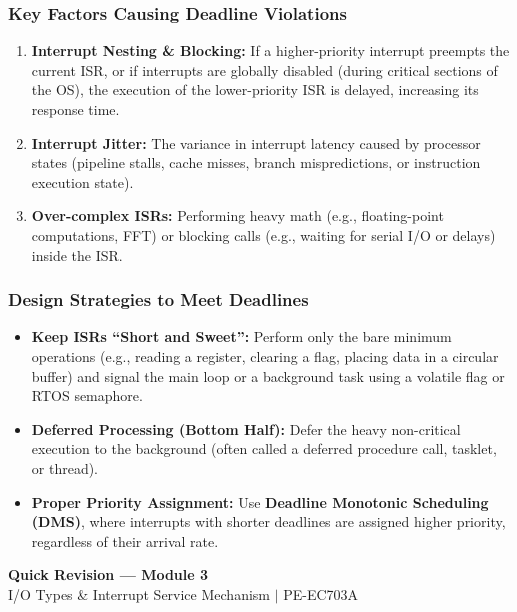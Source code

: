 \documentclass[12pt,a4paper]{article}
\begin{document}
\subsubsection{Key Factors Causing Deadline Violations}
\begin{enumerate}[leftmargin=*, itemsep=3pt]
  \item \textbf{Interrupt Nesting \& Blocking:} If a higher-priority interrupt preempts the current ISR, or if interrupts are globally disabled (during critical sections of the OS), the execution of the lower-priority ISR is delayed, increasing its response time.
  \item \textbf{Interrupt Jitter:} The variance in interrupt latency caused by processor states (pipeline stalls, cache misses, branch mispredictions, or instruction execution state).
  \item \textbf{Over-complex ISRs:} Performing heavy math (e.g., floating-point computations, FFT) or blocking calls (e.g., waiting for serial I/O or delays) inside the ISR.
\end{enumerate}

\subsubsection{Design Strategies to Meet Deadlines}
\begin{itemize}[leftmargin=*, itemsep=3pt]
  \item \textbf{Keep ISRs ``Short and Sweet'':} Perform only the bare minimum operations (e.g., reading a register, clearing a flag, placing data in a circular buffer) and signal the main loop or a background task using a volatile flag or RTOS semaphore.
  \item \textbf{Deferred Processing (Bottom Half):} Defer the heavy non-critical execution to the background (often called a deferred procedure call, tasklet, or thread).
  \item \textbf{Proper Priority Assignment:} Use \textbf{Deadline Monotonic Scheduling (DMS)}, where interrupts with shorter deadlines are assigned higher priority, regardless of their arrival rate.
\end{itemize}

\newpage
\begin{center}
  {\large\bfseries\color{myred} Quick Revision --- Module 3}\\[3pt]
  {\small\color{mydark} I/O Types \& Interrupt Service Mechanism $|$ PE-EC703A}
\end{center}
\noindent{\color{myred}\rule{\linewidth}{1.2pt}}
\vspace{4pt}
\end{document}
